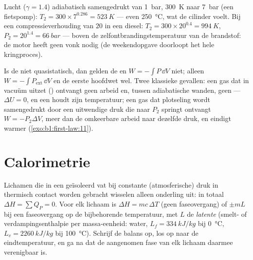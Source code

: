 \begin{example}\label{ex:b1:first-law:diesel}
Lucht ($\gamma = 1.4$) adiabatisch samengedrukt van \qty{1}{bar}, \qty{300}{K}
naar \qty{7}{bar} (een fietspomp): $T_2 = 300 \times 7^{0.286} = \qty{523}{K}$
--- even \qty{250}{\degreeCelsius}, wat de cilinder voelt. Bij een
compressieverhouding van $20$ in een diesel: $T_2 = 300 \times 20^{0.4} = \qty{994}{K}$,
$P_2 = 20^{1.4} = \qty{66}{bar}$ --- boven de zelfontbrandingstemperatuur van
de brandstof: de motor heeft geen vonk nodig (de weekendopgave doorloopt het
hele kringproces).
\end{example}

\begin{remark}\label{rem:b1:first-law:irreversible}
Is de  niet quasistatisch, dan gelden de  en $W =
-\int P\,\dd V$ niet; alleen $W = -\int P_{\mathrm{ext}}\,\dd V$ en de
eerste hoofdwet wel. Twee klassieke gevallen: een gas dat in vacuüm uitzet () ontvangt geen arbeid en, tussen adiabatische wanden, geen  --- $\Delta U
= 0$, en een  houdt zijn temperatuur; een gas dat plotseling wordt samengedrukt
door een uitwendige druk die naar $P_2$ springt ontvangt $W = -P_2\Delta V$, meer
dan de omkeerbare arbeid naar dezelfde druk, en eindigt warmer
(\cref{exo:b1:first-law:11}).
\end{remark}

\section{Calorimetrie}

\begin{method}\label{met:b1:first-law:calorimetry}
Lichamen die in een geïsoleerd vat bij constante (atmosferische) druk in
thermisch contact worden gebracht wisselen alleen onderling  uit: in totaal
$\Delta H = \sum Q_P = 0$. Voor elk lichaam is $\Delta H = mc\,\Delta T$ (geen
faseovergang) of $\pm mL$ bij een faseovergang op de bijbehorende temperatuur,
met $L$ de \emph{latente } (smelt- of verdampingsenthalpie per
massa-eenheid: water, $L_f = \qty{334}{kJ/kg}$ bij \qty{0}{\degreeCelsius}, $L_v =
\qty{2260}{kJ/kg}$ bij \qty{100}{\degreeCelsius}). Schrijf de balans op, los
op naar de eindtemperatuur, en ga na dat de aangenomen fase van elk lichaam
daarmee verenigbaar is.
\end{method}


